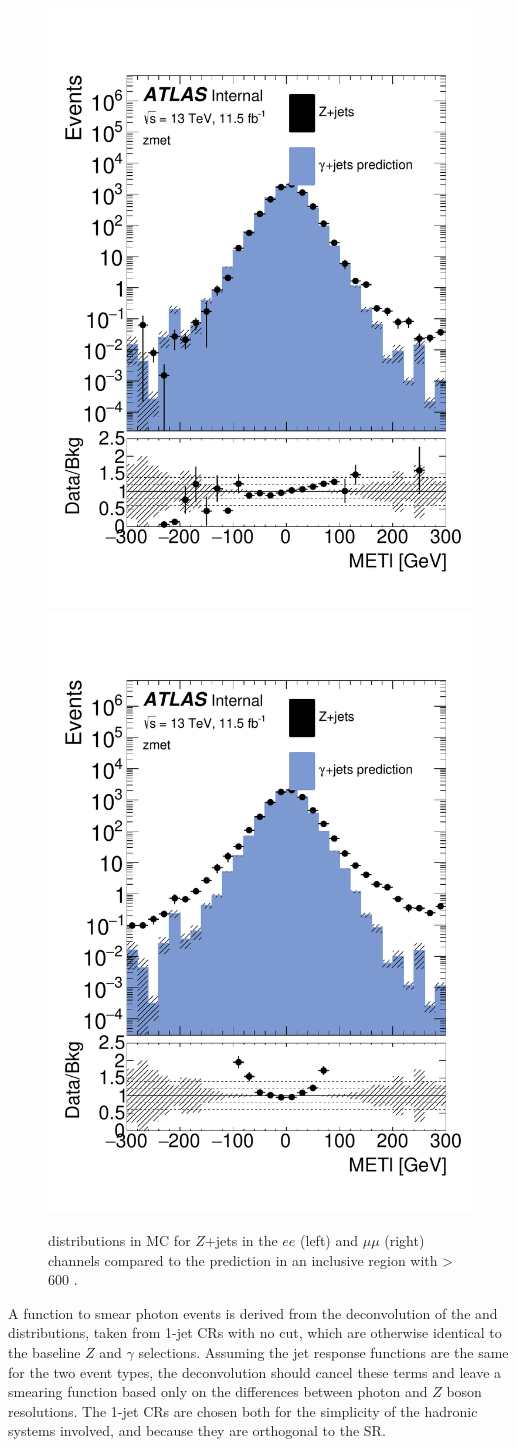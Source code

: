 \begin{centering}
\begin{figure}[!hbt]
\myfloatalign
\includegraphics[width=.45\linewidth]{figures/photons/MC_hist_METl_Pt_0_ee_2j_2016_mcmetl_ptrw__zmet_.pdf}
\includegraphics[width=.45\linewidth]{figures/photons/MC_hist_METl_Pt_0_mm_2j_2016_mcmetl_ptrw__zmet_.pdf}
\caption{\metl distributions in \ac{MC} for $Z$+jets in the $ee$ (left) and $\mu\mu$ (right) channels compared to the \gjets prediction in an inclusive region with \HT > 600 \gev.}
\label{fig:photon_metparallel}
\end{figure}
\end{centering}

A function to smear photon events is derived from the deconvolution of the \gjets and \dyjets \metl distributions, taken from 1-jet \acp{CR} with no \HT cut, which are otherwise identical to the baseline $Z$ and $\gamma$ selections. Assuming the jet response functions are the same for the two event types, the deconvolution should cancel these terms and leave a smearing function based only on the differences between photon and $Z$ boson resolutions. The 1-jet \acp{CR} are chosen both for the simplicity of the hadronic systems involved, and because they are orthogonal to the \ac{SR}.  

